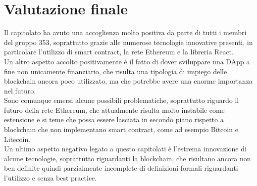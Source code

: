 \documentclass[StudioDiFattibilità.tex]{subfiles}
\begin{document}
\section{Valutazione finale}
Il capitolato ha avuto una accoglienza molto positiva da parte di tutti i membri del gruppo 353, soprattutto grazie alle numerose tecnologie innovative presenti, in particolare l'utilizzo di smart contract, la rete Ethereum e la libreria React.\\
Un altro aspetto accolto positivamente è il fatto di dover sviluppare una DApp a fine non unicamente finanziario, che risulta una tipologia di impiego delle blockchain ancora poco utilizzato, ma che potrebbe avere una enorme importanza nel futuro.\\
Sono comunque emersi alcune possibili problematiche, soprattutto riguardo il futuro della rete Ethereum, che attualmente risulta molto instabile come estensione e si teme che possa essere lasciata in secondo piano rispetto a blockchain che non implementano smart contract, come ad esempio Bitcoin e Litecoin.\\
Un ultimo aspetto negativo legato a questo capitolati è l'estrema innovazione di alcune tecnologie, soprattutto riguardanti la blockchain, che risultano ancora non ben definite quindi parzialmente incomplete di definizioni formali riguardanti l'utilizzo e senza best practice.
\end{document}
